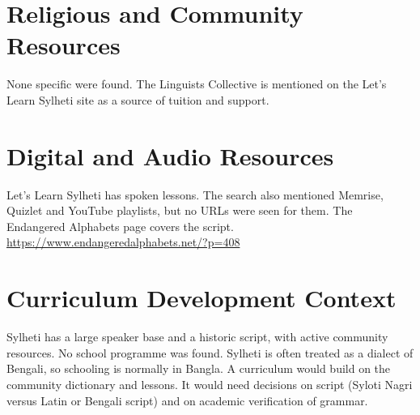 \documentclass[12pt]{article}
\begin{document}
\section{Religious and Community Resources}
None specific were found. The Linguists Collective is mentioned on the Let's Learn Sylheti site as a source of tuition and support.

\section{Digital and Audio Resources}
Let's Learn Sylheti has spoken lessons. The search also mentioned Memrise, Quizlet and YouTube playlists, but no URLs were seen for them. The Endangered Alphabets page covers the script. \url{https://www.endangeredalphabets.net/?p=408}

\section{Curriculum Development Context}
Sylheti has a large speaker base and a historic script, with active community resources. No school programme was found. Sylheti is often treated as a dialect of Bengali, so schooling is normally in Bangla. A curriculum would build on the community dictionary and lessons. It would need decisions on script (Syloti Nagri versus Latin or Bengali script) and on academic verification of grammar.
\end{document}
